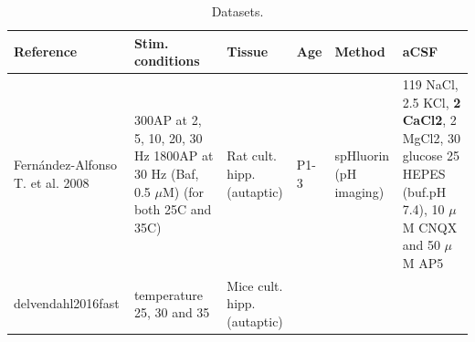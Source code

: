 \documentclass[fleqn,10pt]{wlscirep}
\begin{document}
\begin{table}[!ht]
	\centering
	\caption{Datasets.}
	\label{tab:model_params}
	\begin{tabular}{@{}llllll@{}}
		\toprule
		{\bf Reference} & {\bf Stim. conditions} & {\bf Tissue} & {\bf Age} & {\bf Method} & {\bf aCSF}     \\
		\midrule
		Fernández-Alfonso T. et al. 2008 \cite{fernandez-alfonsoKineticsSynapticVesicle2004} & \makecell[l]{300AP at 2, 5, 10, 20, 30 Hz \\ 1800AP at 30 Hz (Baf, 0.5 $\mu$M) \\ (for both 25C and 35C)}&\makecell[l]{Rat cult. hipp. \\ (autaptic)} & P1-3 & \makecell[l]{spHluorin \\ (pH imaging)} & \makecell[l]{ 119 NaCl, 2.5 KCl, \\ {\bf 2 CaCl2}, \\ 2 MgCl2, 30 glucose\\ 25 HEPES (buf.pH 7.4), \\ 10 $\mu$M CNQX \\ and 50 $\mu$M AP5} \\
	delvendahl2016fast \cite{delvendahl2016fast} & temperature 25, 30 and 35 & \makecell[l]{Mice cult. hipp. \\ (autaptic)} \\

		
	\end{tabular}
\end{table}
\newpage

\end{document}
